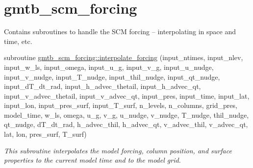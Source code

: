 \hypertarget{group__forcing}{}\section{gmtb\+\_\+scm\+\_\+forcing}
\label{group__forcing}


Contains subroutines to handle the S\+CM forcing -- interpolating in space and time, etc.  


\begin{DoxyCompactItemize}
\item 
subroutine \hyperlink{group__forcing_gaee4d8a92d081863df4499f2e1dce82bd}{gmtb\+\_\+scm\+\_\+forcing\+::interpolate\+\_\+forcing} (input\+\_\+ntimes, input\+\_\+nlev, input\+\_\+w\+\_\+ls, input\+\_\+omega, input\+\_\+u\+\_\+g, input\+\_\+v\+\_\+g, input\+\_\+u\+\_\+nudge,           input\+\_\+v\+\_\+nudge, input\+\_\+\+T\+\_\+nudge, input\+\_\+thil\+\_\+nudge, input\+\_\+qt\+\_\+nudge, input\+\_\+d\+T\+\_\+dt\+\_\+rad, input\+\_\+h\+\_\+advec\+\_\+thetail, input\+\_\+h\+\_\+advec\+\_\+qt,           input\+\_\+v\+\_\+advec\+\_\+thetail, input\+\_\+v\+\_\+advec\+\_\+qt, input\+\_\+pres, input\+\_\+time, input\+\_\+lat, input\+\_\+lon, input\+\_\+pres\+\_\+surf, input\+\_\+\+T\+\_\+surf, n\+\_\+levels,       n\+\_\+columns, grid\+\_\+pres, model\+\_\+time, w\+\_\+ls, omega, u\+\_\+g, v\+\_\+g, u\+\_\+nudge, v\+\_\+nudge, T\+\_\+nudge, thil\+\_\+nudge, qt\+\_\+nudge, d\+T\+\_\+dt\+\_\+rad,           h\+\_\+advec\+\_\+thil, h\+\_\+advec\+\_\+qt, v\+\_\+advec\+\_\+thil, v\+\_\+advec\+\_\+qt, lat, lon, pres\+\_\+surf, T\+\_\+surf)
\begin{DoxyCompactList}\small\item\em This subroutine interpolates the model forcing, column position, and surface properties to the current model time and to the model grid. \end{DoxyCompactList}\end{DoxyCompactItemize}
